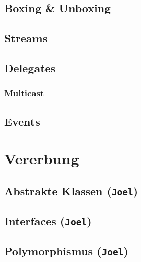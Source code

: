 \documentclass[
  9pt,
  a4paperpaper,
  DIV=11]{scrartcl}
\numberwithin{equation}{section}
\begin{document}
\begin{multicols}{2}
\hypertarget{boxing-unboxing}{%
\subsection{Boxing \& Unboxing}\label{boxing-unboxing}}

\hypertarget{streams}{%
\subsection{Streams}\label{streams}}

\hypertarget{delegates}{%
\subsection{Delegates}\label{delegates}}

\hypertarget{multicast}{%
\subsubsection{Multicast}\label{multicast}}

\hypertarget{events}{%
\subsection{Events}\label{events}}

\hypertarget{vererbung}{%
\section{Vererbung}\label{vererbung}}

\hypertarget{abstrakte-klassen-joel}{%
\subsection{\texorpdfstring{Abstrakte Klassen
(\texttt{Joel})}{Abstrakte Klassen (Joel)}}\label{abstrakte-klassen-joel}}

\hypertarget{interfaces-joel}{%
\subsection{\texorpdfstring{Interfaces
(\texttt{Joel})}{Interfaces (Joel)}}\label{interfaces-joel}}

\hypertarget{polymorphismus-joel}{%
\subsection{\texorpdfstring{Polymorphismus
(\texttt{Joel})}{Polymorphismus (Joel)}}\label{polymorphismus-joel}}


\end{multicols}
\end{document}
